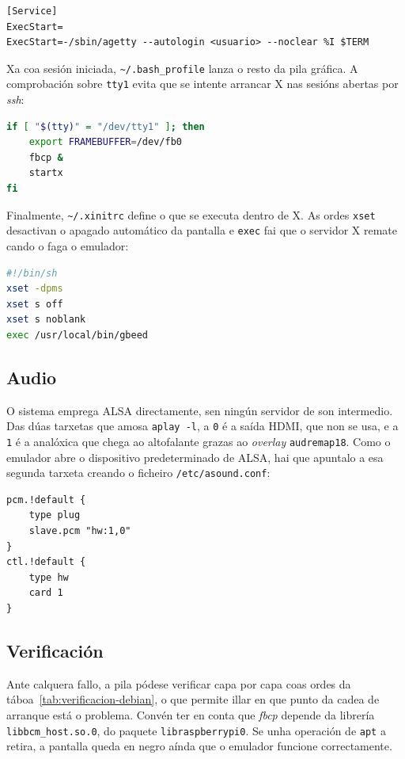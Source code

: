 \begin{lstlisting}
[Service]
ExecStart=
ExecStart=-/sbin/agetty --autologin <usuario> --noclear %I $TERM
\end{lstlisting}

Xa coa sesión iniciada, \texttt{\textasciitilde/.bash\_profile} lanza o resto da pila gráfica.
A comprobación sobre \texttt{tty1} evita que se intente arrancar X nas sesións abertas por \textit{ssh}:

\begin{lstlisting}[language=bash]
if [ "$(tty)" = "/dev/tty1" ]; then
    export FRAMEBUFFER=/dev/fb0
    fbcp &
    startx
fi
\end{lstlisting}

Finalmente, \texttt{\textasciitilde/.xinitrc} define o que se executa dentro de X. As ordes \texttt{xset}
desactivan o apagado automático da pantalla e \texttt{exec} fai que o servidor X remate cando o faga o
emulador:

\begin{lstlisting}[language=bash]
#!/bin/sh
xset -dpms
xset s off
xset s noblank
exec /usr/local/bin/gbeed
\end{lstlisting}

\subsection{Audio}

O sistema emprega ALSA directamente, sen ningún servidor de son intermedio. Das dúas tarxetas que amosa
\texttt{aplay -l}, a \texttt{0} é a saída HDMI, que non se usa, e a \texttt{1} é a analóxica que chega ao
altofalante grazas ao \textit{overlay} \texttt{audremap18}. Como o emulador abre o dispositivo
predeterminado de ALSA, hai que apuntalo a esa segunda tarxeta creando o ficheiro
\texttt{/etc/asound.conf}:

\begin{lstlisting}
pcm.!default {
    type plug
    slave.pcm "hw:1,0"
}
ctl.!default {
    type hw
    card 1
}
\end{lstlisting}

\subsection{Verificación}

Ante calquera fallo, a pila pódese verificar capa por capa coas ordes da táboa~\ref{tab:verificacion-debian},
o que permite illar en que punto da cadea de arranque está o problema. Convén ter en conta que
\textit{fbcp} depende da librería \texttt{libbcm\_host.so.0}, do paquete \texttt{libraspberrypi0}. Se unha
operación de \texttt{apt} a retira, a pantalla queda en negro aínda que o emulador funcione correctamente.

